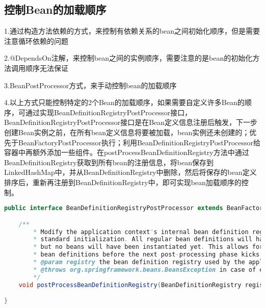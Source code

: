 \documentclass[../../../interview-questions.tex]{subfiles}
\begin{document}
\subsection{控制Bean的加载顺序}

1.通过构造方法依赖的方式，来控制有依赖关系的bean之间初始化顺序，但是需要注意循环依赖的问题

2.@DependsOn注解，来控制bean之间的实例顺序，需要注意的是bean的初始化方法调用顺序无法保证

3.BeanPostProcessor方式，来手动控制bean的加载顺序

4.以上方式只能控制特定的2个Bean的加载顺序，如果需要自定义许多Bean的顺序，可通过实现BeanDefinitionRegistryPostProcessor接口，BeanDefinitionRegistryPostProcessor接口是在Bean定义信息注册后触发，下一步创建Bean实例之前，在所有bean定义信息将要被加载，bean实例还未创建的；优先于BeanFactoryPostProcessor执行；利用BeanDefinitionRegistryPostProcessor给容器中再额外添加一些组件。在postProcessBeanDefinitionRegistry方法中通过BeanDefinitionRegistry获取到所有bean的注册信息，将bean保存到LinkedHashMap中，并从BeanDefinitionRegistry中删除，然后将保存的bean定义排序后，重新再注册到BeanDefinitionRegistry中，即可实现bean加载顺序的控制。

\begin{lstlisting}[language=Java]
public interface BeanDefinitionRegistryPostProcessor extends BeanFactoryPostProcessor {

    /**
        * Modify the application context's internal bean definition registry after its
        * standard initialization. All regular bean definitions will have been loaded,
        * but no beans will have been instantiated yet. This allows for adding further
        * bean definitions before the next post-processing phase kicks in.
        * @param registry the bean definition registry used by the application context
        * @throws org.springframework.beans.BeansException in case of errors
        */
    void postProcessBeanDefinitionRegistry(BeanDefinitionRegistry registry) throws BeansException;

}
\end{lstlisting}
\end{document}
